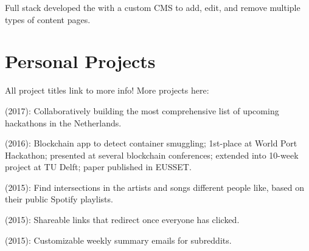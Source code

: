 \documentclass[]{deedy-resume-openfont}
\begin{document}
\begin{minipage}[t]{0.66\textwidth}
\begin{tightemize}
    \item Full stack developed the \href{http://mugsy.tv/}{} with a custom CMS to add, edit, and remove multiple types of content pages.
\end{tightemize}


\section{Personal Projects}

All project titles link to more info! More projects here: \href{http://leonoverweel.com/}{}

\begin{tightemize}
    \item \href{http://hackathonlist.nl/}{} (2017): Collaboratively building the most comprehensive list of upcoming hackathons in the Netherlands.
    \item \href{http://leonoverweel.com/world-port-hackathon-2016}{} (2016): Blockchain app to detect container smuggling; 1st-place at World Port Hackathon; presented at several blockchain conferences; extended into 10-week project at TU Delft; paper published in EUSSET.
    \item \href{http://leonoverweel.com/intersect.ninja}{} (2015): Find intersections in the artists and songs different people like, based on their public Spotify playlists.
    \item \href{http://leonoverweel.com/link-syncer}{} (2015): Shareable links that redirect once everyone has clicked. \item \href{http://leonoverweel.com/reddit-weekly}{} (2015): Customizable weekly summary emails for subreddits.
\end{tightemize}



\end{minipage}
\end{document}

